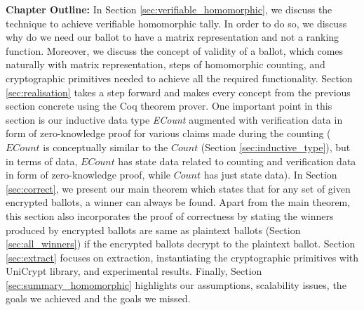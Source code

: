 \textbf{Chapter Outline:} In Section \ref{sec:verifiable_homomorphic}, 
we discuss the technique to achieve verifiable homomorphic tally. In order to do so, 
we discuss why do we need our ballot to have a matrix representation 
and not a ranking function. Moreover, we discuss the concept 
of validity of a ballot, which comes naturally with matrix representation, 
steps of homomorphic counting, and cryptographic primitives needed 
to achieve all the required functionality. Section \ref{sec:realisation} 
takes a step forward and makes every concept from the previous section
concrete using the Coq theorem prover. One important point 
in this section is our inductive data type \textit{ECount}
augmented with verification data in form of zero-knowledge proof 
for various claims made during the counting 
($ECount$ is conceptually similar to the $Count$ (Section \ref{sec:inductive_type}), but 
in terms of data, $ECount$ has state data related to counting and verification data
in form of zero-knowledge proof, while $Count$ 
has just state data).  In Section \ref{sec:correct}, we present
our main theorem which states that for any set of given encrypted ballots, 
a winner can always be found. Apart from the main theorem, this section 
also incorporates the proof of correctness by stating 
the winners produced by encrypted ballots are same as 
plaintext ballots (Section \ref{sec:all_winners}) if 
 the encrypted ballots decrypt to the plaintext ballot. 
 Section \ref{sec:extract} focuses on extraction, instantiating 
 the cryptographic primitives with UniCrypt library, and 
 experimental results. Finally, Section \ref{sec:summary_homomorphic} 
 highlights our assumptions, scalability issues, the 
 goals we achieved and the goals we missed. 


 


